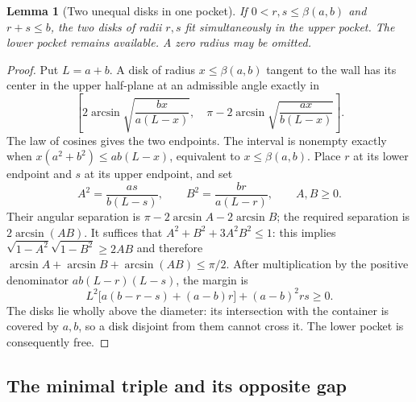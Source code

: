 \documentclass[11pt]{article}
\newtheorem{lemma}[theorem]{Lemma}
\theoremstyle{definition}
\begin{document}
\begin{lemma}[Two unequal disks in one pocket]\label{gt:arbelos}
If $0<r,s\le\beta(a,b)$ and $r+s\le b$, the two disks of radii
$r,s$ fit simultaneously in the upper pocket. The lower pocket remains
available. A zero radius may be omitted.
\end{lemma}
\begin{proof}
Put $L=a+b$. A disk of radius $x\le\beta(a,b)$ tangent to the wall
has its center in the upper half-plane at an admissible angle exactly in
\[
 \left[2\arcsin\sqrt{\frac{bx}{a(L-x)}},\quad
 \pi-2\arcsin\sqrt{\frac{ax}{b(L-x)}}\right].
\]
The law of cosines gives the two endpoints. The interval is nonempty
exactly when $x(a^2+b^2)\le ab(L-x)$, equivalent to $x\le\beta(a,b)$.
Place $r$ at its lower endpoint and $s$ at its upper endpoint, and set
\[
 A^2=\frac{as}{b(L-s)},\qquad B^2=\frac{br}{a(L-r)},\qquad A,B\ge0.
\]
Their angular separation is $\pi-2\arcsin A-2\arcsin B$; the
required separation is $2\arcsin(AB)$. It suffices that
$A^2+B^2+3A^2B^2\le1$: this implies
$\sqrt{1-A^2}\sqrt{1-B^2}\ge2AB$ and therefore
$\arcsin A+\arcsin B+\arcsin(AB)\le\pi/2$.
After multiplication by the positive denominator $ab(L-r)(L-s)$,
the margin is
\[
 L^2\bigl[a(b-r-s)+(a-b)r\bigr]+(a-b)^2rs\ge0.
\]
The disks lie wholly above the diameter: its intersection with the
container is covered by $a,b$, so a disk disjoint from them cannot
cross it. The lower pocket is consequently free.
\end{proof}

\subsection{The minimal triple and its opposite gap}
\end{document}
